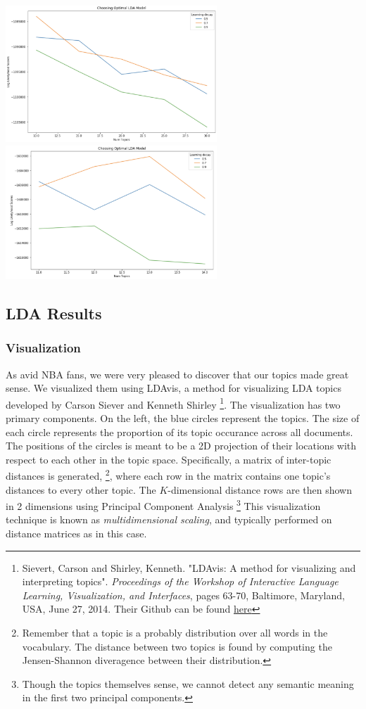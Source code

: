 \documentclass[11pt]{article}
\begin{document}
\includegraphics[width=225pt]{gridsearch.png} \includegraphics[width=225pt]{gridsearch2.png} 

\subsection{LDA Results}
\subsubsection{Visualization}
As avid NBA fans, we were very pleased to discover that our topics made great sense.  We visualized them using LDAvis, a method for visualizing LDA topics developed by Carson Siever and Kenneth Shirley \footnote{Sievert, Carson and Shirley, Kenneth. "LDAvis: A method for visualizing and interpreting topics". \textit{Proceedings of the Workshop of Interactive Language Learning, Visualization, and Interfaces}, pages 63-70, Baltimore, Maryland, USA, June 27, 2014. Their Github can be found \href{https://github.com/cpsievert/LDAvis}{here}}.  The visualization has two primary components.  On the left, the blue circles represent the topics. The size of each circle represents the proportion of its topic occurance across all documents. The positions of the circles is meant to be a 2D projection of their locations with respect to each other in the topic space. Specifically, a matrix of inter-topic distances is generated, \footnote{Remember that a topic is a probably distribution over all words in the vocabulary. The distance between two topics is found by computing the Jensen-Shannon diveragence between their distribution.}, where each row in the matrix contains one topic's distances to every other topic.  The $K$-dimensional distance rows are then shown in 2 dimensions using Principal Component Analysis \footnote{Though the topics themselves sense, we cannot detect any semantic meaning in the first two principal components.} This visualization technique is known as \textit{multidimensional scaling}, and typically performed on distance matrices as in this case. 
\end{document}
